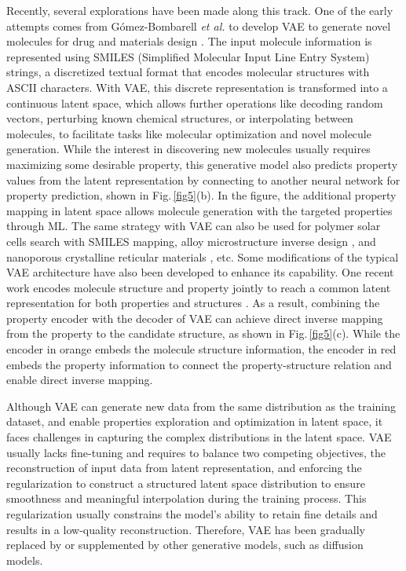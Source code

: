 \documentclass[fleqn,10pt]{wlscirep}
\begin{document}
Recently, several explorations have been made along this track. One of the early attempts comes from Gómez-Bombarell \textit{et al.} to develop VAE to generate novel molecules for drug and materials design \cite{gomez2018automatic}. The input molecule information is represented using SMILES (Simplified Molecular Input Line Entry System) strings, a discretized textual format that encodes molecular structures with ASCII characters. With VAE, this discrete representation is transformed into a continuous latent space, which allows further operations like decoding random vectors, perturbing known chemical structures, or interpolating between molecules, to facilitate tasks like molecular optimization and novel molecule generation. While the interest in discovering new molecules usually requires maximizing some desirable property, this generative model also predicts property values from the latent representation by connecting to another neural network for property prediction, shown in Fig.\,\ref{fig5}(b). In the figure, the additional property mapping in latent space allows molecule generation with the targeted properties through ML. The same strategy with VAE can also be used for polymer solar cells search \cite{jorgensen2018machine} with SMILES mapping, alloy microstructure inverse design \cite{pei2021machine}, and nanoporous crystalline reticular materials \cite{yao2021inverse}, etc. Some modifications of the typical VAE architecture have also been developed to enhance its capability. One recent work encodes molecule structure and property jointly to reach a common latent representation for both properties and structures \cite{fallani2024inverse}. As a result, combining the property encoder with the decoder of VAE can achieve direct inverse mapping from the property to the candidate structure, as shown in Fig.\,\ref{fig5}(c). While the encoder in orange embeds the molecule structure information, the encoder in red embeds the property information to connect the property-structure relation and enable direct inverse mapping.

Although VAE can generate new data from the same distribution as the training dataset, and enable properties exploration and optimization in latent space, it faces challenges in capturing the complex distributions in the latent space. VAE usually lacks fine-tuning and requires to balance two competing objectives, the reconstruction of input data from latent representation, and enforcing the regularization to construct a structured latent space distribution to ensure smoothness and meaningful interpolation during the training process. This regularization usually constrains the model’s ability to retain fine details and results in a low-quality reconstruction. Therefore, VAE has been gradually replaced by or supplemented by other generative models, such as diffusion models.
\end{document}
